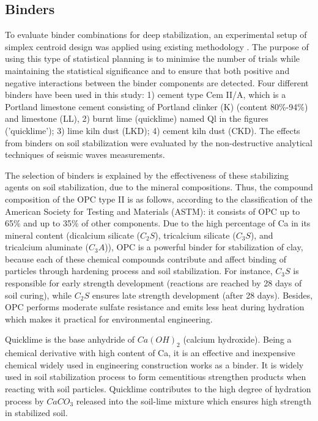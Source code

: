 \documentclass[USenglish,twocolumn]{article}
\begin{document}
\subsection{Binders}
To evaluate binder combinations for deep stabilization, an experimental setup of simplex centroid design was applied using existing methodology \citep{Montgomery2019,Myres}. The purpose of using this type of statistical planning is to minimise the number of trials while maintaining the statistical significance and to ensure that both positive and negative interactions between the binder components are detected. Four different binders have been used in this study: 1) cement type Cem II/A, which is a Portland limestone cement consisting of Portland clinker (K) (content 80\%-94\%) and limestone (LL), 2) burnt lime (quicklime) named Ql in the figures ('quicklime'); 3) lime kiln dust (LKD); 4) cement kiln dust (CKD). The effects from binders on soil stabilization were evaluated by the non-destructive analytical techniques of seismic waves measurements. 

The selection of binders is explained by the effectiveness of these stabilizing agents on soil stabilization, due to the mineral compositions. Thus, the compound composition of the OPC type II is as follows, according to the classification of the American Society for Testing and Materials (ASTM): it consists of OPC up to 65\% and up to 35\% of other components. Due to the high percentage of Ca in its mineral content (dicalcium silicate ($C_2 S$), tricalcium silicate ($C_3 S$), and tricalcium aluminate ($C_3 A$)), OPC is a powerful binder for stabilization of clay, because each of these chemical compounds contribute and affect binding of particles through hardening process and soil stabilization. For instance, $C_3 S$ is responsible for early strength development (reactions are reached by 28 days of soil curing), while $C_2 S$ ensures late strength development (after 28 days). Besides, OPC performs moderate sulfate resistance and emits less heat during hydration which makes it practical for environmental engineering.

Quicklime is the base anhydride of $Ca(OH)_2$ (calcium hydroxide). Being a chemical derivative with high content of Ca, it is an effective and inexpensive chemical widely used in engineering construction works as a binder. It is widely used in soil stabilization process to form cementitious strengthen products when reacting with soil particles. Quicklime contributes to the high degree of hydration process by $CaCO_3$ released into the soil-lime mixture which ensures high strength in stabilized soil. 
\end{document}
